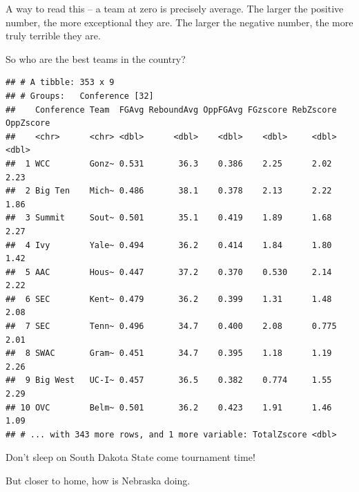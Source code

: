 \documentclass[]{book}
\newenvironment{Shaded}{\begin{snugshade}}{\end{snugshade}}
\newcommand{\KeywordTok}[1]{\textcolor[rgb]{0.13,0.29,0.53}{\textbf{#1}}}
\newcommand{\StringTok}[1]{\textcolor[rgb]{0.31,0.60,0.02}{#1}}
\newcommand{\OperatorTok}[1]{\textcolor[rgb]{0.81,0.36,0.00}{\textbf{#1}}}
\newcommand{\NormalTok}[1]{#1}
\begin{document}
A way to read this -- a team at zero is precisely average. The larger
the positive number, the more exceptional they are. The larger the
negative number, the more truly terrible they are.

So who are the best teams in the country?

\begin{Shaded}
\end{Shaded}

\begin{verbatim}
## # A tibble: 353 x 9
## # Groups:   Conference [32]
##    Conference Team  FGAvg ReboundAvg OppFGAvg FGzscore RebZscore OppZscore
##    <chr>      <chr> <dbl>      <dbl>    <dbl>    <dbl>     <dbl>     <dbl>
##  1 WCC        Gonz~ 0.531       36.3    0.386    2.25      2.02       2.23
##  2 Big Ten    Mich~ 0.486       38.1    0.378    2.13      2.22       1.86
##  3 Summit     Sout~ 0.501       35.1    0.419    1.89      1.68       2.27
##  4 Ivy        Yale~ 0.494       36.2    0.414    1.84      1.80       1.42
##  5 AAC        Hous~ 0.447       37.2    0.370    0.530     2.14       2.22
##  6 SEC        Kent~ 0.479       36.2    0.399    1.31      1.48       2.08
##  7 SEC        Tenn~ 0.496       34.7    0.400    2.08      0.775      2.01
##  8 SWAC       Gram~ 0.451       34.7    0.395    1.18      1.19       2.26
##  9 Big West   UC-I~ 0.457       36.5    0.382    0.774     1.55       2.29
## 10 OVC        Belm~ 0.501       36.2    0.423    1.91      1.46       1.09
## # ... with 343 more rows, and 1 more variable: TotalZscore <dbl>
\end{verbatim}

Don't sleep on South Dakota State come tournament time!

But closer to home, how is Nebraska doing.

\begin{Shaded}
\end{Shaded}
\end{document}
